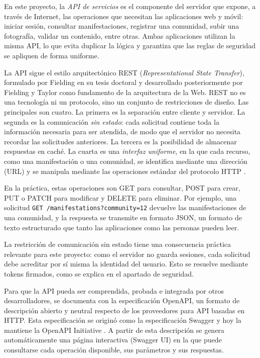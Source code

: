En este proyecto, la \textit{API de servicios} es el componente del servidor que expone, a través de Internet, las operaciones que necesitan las aplicaciones web y móvil: iniciar sesión, consultar manifestaciones, registrar una comunidad, subir una fotografía, validar un contenido, entre otras. Ambas aplicaciones utilizan la misma API, lo que evita duplicar la lógica y garantiza que las reglas de seguridad se apliquen de forma uniforme.

La API sigue el estilo arquitectónico REST (\textit{Representational State Transfer}), formulado por Fielding en su tesis doctoral \cite{fielding2000rest} y desarrollado posteriormente por Fielding y Taylor \cite{fielding2002principled} como fundamento de la arquitectura de la Web. REST no es una tecnología ni un protocolo, sino un conjunto de restricciones de diseño. Las principales son cuatro. La primera es la separación entre cliente y servidor. La segunda es la comunicación \textit{sin estado}: cada solicitud contiene toda la información necesaria para ser atendida, de modo que el servidor no necesita recordar las solicitudes anteriores. La tercera es la posibilidad de almacenar respuestas en caché. La cuarta es una \textit{interfaz uniforme}, en la que cada recurso, como una manifestación o una comunidad, se identifica mediante una dirección (URL) y se manipula mediante las operaciones estándar del protocolo HTTP \cite{fielding2000rest}.

En la práctica, estas operaciones son GET para consultar, POST para crear, PUT o PATCH para modificar y DELETE para eliminar. Por ejemplo, una solicitud \texttt{GET /manifestations?community=12} devuelve las manifestaciones de una comunidad, y la respuesta se transmite en formato JSON, un formato de texto estructurado que tanto las aplicaciones como las personas pueden leer.

La restricción de comunicación sin estado tiene una consecuencia práctica relevante para este proyecto: como el servidor no guarda sesiones, cada solicitud debe acreditar por sí misma la identidad del usuario. Esto se resuelve mediante tokens firmados, como se explica en el apartado de seguridad.

Para que la API pueda ser comprendida, probada e integrada por otros desarrolladores, se documenta con la especificación OpenAPI, un formato de descripción abierto y neutral respecto de los proveedores para API basadas en HTTP. Esta especificación se originó como la especificación Swagger y hoy la mantiene la OpenAPI Initiative \cite{openapi2021spec}. A partir de esta descripción se genera automáticamente una página interactiva (Swagger UI) en la que puede consultarse cada operación disponible, sus parámetros y sus respuestas.

